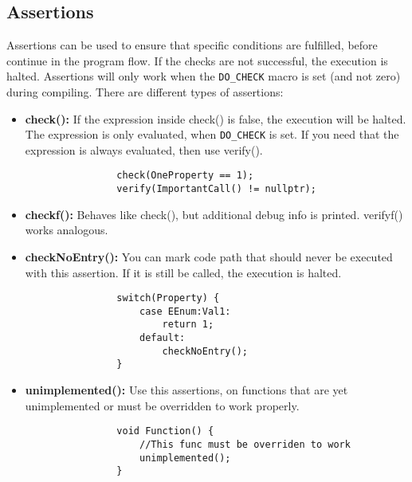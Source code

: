 \documentclass[10pt,a4paper]{article}
\begin{document}
\begin{multicols*}{2}
	\subsection{Assertions}
	Assertions can be used to ensure that specific conditions are fulfilled, before continue in the program flow. If the checks are not successful, the execution is halted. Assertions will only work when the \verb|DO_CHECK| macro is set (and not zero) during compiling.
	There are different types of assertions:
	\begin{itemize}
		\item \textbf{check():} If the expression inside check() is false, the execution will be halted. The expression is only evaluated, when \verb|DO_CHECK| is set. If you need that the expression is always evaluated, then use verify().
			\begin{verbatim}
				check(OneProperty == 1);
				verify(ImportantCall() != nullptr);
			\end{verbatim}
		\item \textbf{checkf():} Behaves like check(), but additional debug info is printed. verifyf() works analogous.
		\item \textbf{checkNoEntry():} You can mark code path that should never be executed with this assertion. If it is still be called, the execution is halted.
			\begin{verbatim}
				switch(Property) {
				    case EEnum:Val1:
				        return 1;
				    default:
				        checkNoEntry();
				}
			\end{verbatim}
		\item \textbf{unimplemented():} Use this assertions, on functions that are yet unimplemented or must be overridden to work properly.
			\begin{verbatim}
				void Function() {
				    //This func must be overriden to work
				    unimplemented();   
				}
			\end{verbatim}
	\end{itemize}


\end{multicols*}
\end{document}
